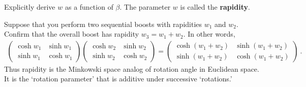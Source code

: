 \documentclass[12pt]{article}
\begin{document}
Explicitly derive $w$ as a function of $\beta$. The parameter $w$ is called the \textbf{rapidity}. 

Suppose that you perform two sequential boosts with rapidities $w_1$ and $w_2$. Confirm that the overall boost has rapidity $w_3 = w_1+w_2$. In other words,
\begin{align}
	\begin{pmatrix}
		\cosh w_1 & \sinh w_1
		\\
		\sinh w_1 & \cosh w_1
	\end{pmatrix}
	\begin{pmatrix}
		\cosh w_2 & \sinh w_2
		\\
		\sinh w_2 & \cosh w_2
	\end{pmatrix}
	=
	\begin{pmatrix}
		\cosh(w_1+w_2) & \sinh(w_1+w_2)
		\\
		\sinh(w_1+w_2) & \cosh(w_1+w_2) 
	\end{pmatrix}\ .
\end{align}
Thus rapidity is the Minkowski space analog of rotation angle in Euclidean space. It is the `rotation parameter' that is additive under successive `rotations.'





\end{document}
